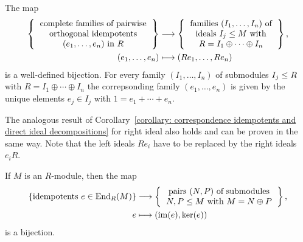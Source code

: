 

\begin{corollary}
  \label{corollary: correspondence idempotents and direct ideal decompositions}
  The map
  \begin{align*}
    \left\{
      \begin{tabular}{c}
        complete families of pairwise \\
        orthogonal idempotents  \\
        $(e_1, \dotsc, e_n)$ in $R$
      \end{tabular}
    \right\}
    &\longto
      \left\{
      \begin{tabular}{c}
        families $(I_1, \dotsc, I_n)$ of  \\
        ideals $I_j \moduleleq M$ with \\
        $R = I_1 \oplus \dotsb \oplus I_n$
      \end{tabular}
      \right\},
    \\
                  (e_1, \dotsc, e_n)
    &\longmapsto  (Re_1, \dotsc, Re_n)
  \end{align*}
  is a well-defined bijection.
  For every family $(I_1, \dotsc, I_n)$ of submodules $I_j \leq R$ with $R = I_1 \oplus \dotsb \oplus I_n$ the correpsonding family $(e_1, \dotsc, e_n)$ is given by the unique elements $e_j \in I_j$ with $1 = e_1 + \dotsb + e_n$.
\end{corollary}




\begin{remark}
  The analogous result of Corollary~\ref{corollary: correspondence idempotents and direct ideal decompositions} for right ideal also holds and can be proven in the same way.
  Note that the left ideals $R e_i$ have to be replaced by the right ideals $e_i R$.
\end{remark}


\begin{corollary}
  If $M$ is an $R$-module, then the map
  \begin{align*}
    \{ \text{idempotents $e \in \End_R(M)$} \}
    &\longto
      \left\{
      \begin{tabular}{c}
        pairs $(N,P)$ of submodules \\
        $N, P \moduleleq M$ with $M = N \oplus P$
      \end{tabular}
      \right\},
    \\
                  e
    &\longmapsto  (\im(e), \ker(e))
  \end{align*}
  is a bijection.
\end{corollary}


